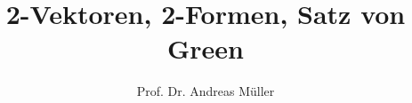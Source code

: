 %
%
%


\beamertemplatenavigationsymbolsempty
\title[Green]{2-Vektoren, 2-Formen, Satz von Green}
\author[A.~Müller]{Prof. Dr. Andreas Müller}
\date[]{}

